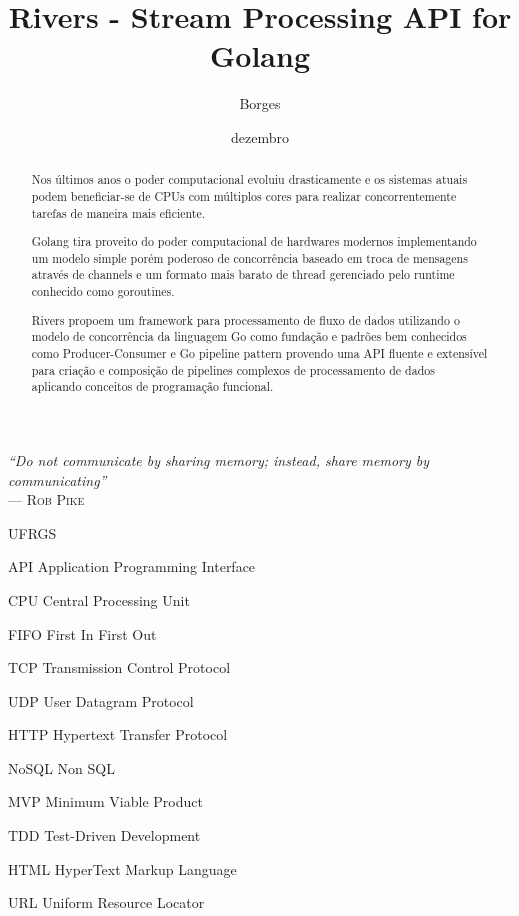 \documentclass[cic,tc]{iiufrgs}
\title{Rivers - Stream Processing API for Golang}
\author{Borges}{Diego}
\date{dezembro}{2015}
\begin{document}
\maketitle

\clearpage
\begin{flushright}
\mbox{}\vfill
{\sffamily\itshape
``Do not communicate by sharing memory; instead, share memory by communicating''\\}
--- \textsc{Rob Pike}
\end{flushright}



%
%

\tableofcontents

\begin{listofabbrv}{UFRGS}
    \item[API] Application Programming Interface
    \item[CPU] Central Processing Unit
    \item[FIFO] First In First Out
    \item[TCP] Transmission Control Protocol
    \item[UDP] User Datagram Protocol
    \item[HTTP] Hypertext Transfer Protocol
    \item[NoSQL] Non SQL
    \item[MVP] Minimum Viable Product
    \item[TDD] Test-Driven Development
    \item[HTML] HyperText Markup Language
    \item[URL] Uniform Resource Locator
\end{listofabbrv}

\listoffigures

\listoftables

\begin{abstract}
Nos últimos anos o poder computacional evoluiu drasticamente e os sistemas atuais podem beneficiar-se de CPUs com múltiplos cores para realizar concorrentemente tarefas de maneira mais eficiente.

Golang tira proveito do poder computacional de hardwares modernos implementando um modelo simple porém poderoso de concorrência baseado em troca de mensagens através de channels e um formato mais barato de thread gerenciado pelo runtime conhecido como goroutines.

Rivers propoem um framework para processamento de fluxo de dados utilizando o modelo de concorrência da linguagem Go como fundação e padrões bem conhecidos como Producer-Consumer e Go pipeline pattern provendo uma API fluente e extensível para criação e composição de pipelines complexos de processamento de dados aplicando conceitos de programação funcional.
\end{abstract}
\end{document}
